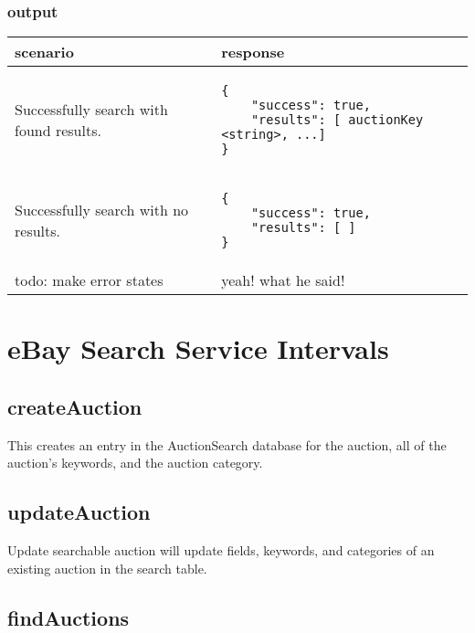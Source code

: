 \documentclass[12pt,a4paper]{article}
\begin{document}
\subsubsection{output}
\begin{center}
    \begin{tabular}{| p{5cm} | l |}
        \hline
        \textbf{scenario} & \textbf{response} \\
        \hline
        Successfully search with found results. &
        \begin{lstlisting}[boxpos=t,language=tablejson,firstnumber=1]
{
    "success": true,
    "results": [ auctionKey <string>, ...]
}
        \end{lstlisting} \\ 
        \hline
 \hline
        Successfully search with no results. &
        \begin{lstlisting}[boxpos=t,language=tablejson,firstnumber=1]
{
    "success": true,
    "results": [ ]
}
        \end{lstlisting} \\ 
        \hline
            todo: make error states & yeah! what he said! \\
        \hline
    \end{tabular}
\end{center}

\section{eBay Search Service Intervals}
\subsection{createAuction}
This creates an entry in the AuctionSearch database for the auction, all of the
auction's keywords, and the auction category.

\subsection{updateAuction}
Update searchable auction will update fields, keywords, and categories of an
existing auction in the search table.

\subsection{findAuctions}
\end{document}
